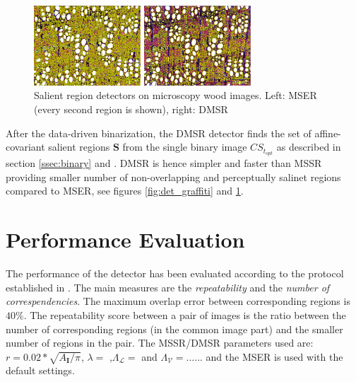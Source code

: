 \documentclass{article}
\def\I{{\mathbf I}}
\def\mcL{{\mathcal{L}}}
\def\mcV{{\mathcal{V}}}
\def\S{{\mathbf S}}
\begin{document}
\begin{figure}[htb]

\begin{minipage}[b]{.49\linewidth}
  \centering
  \centerline{\includegraphics[width=4.0cm]{./Figs/mserWood}}
\end{minipage}
\hfill
\begin{minipage}[b]{0.49\linewidth}
  \centering
  \centerline{\includegraphics[width=4.0cm]{./Figs/dmsrWood}}
\end{minipage}
\vspace{-0.25cm}
\caption{Salient region detectors on microscopy wood images. Left: MSER (every second region is shown), right: DMSR}
\label{fig:wood}
%
\end{figure}
After the data-driven binarization, the DMSR detector finds the set of affine-covariant salient regions $\S$ from the single binary image $CS_{t_{opt}}$ as described in section \ref{ssec:binary} and \cite{RangMSSR06, RangHumpb06}. DMSR is hence simpler and faster than MSSR providing smaller number of non-overlapping and perceptually salinet regions compared to MSER, see figures \ref{fig:det_graffiti} and \ref{fig:wood}.


\section{Performance  Evaluation}
\label{sec:perf}
The performance of the detector has been evaluated according to the protocol established in \cite{Mikolajczyk:2005}. The main measures are the {\em repeatability} and the {\em number of correspendencies}. The maximum overlap error between corresponding regions is $40\%$. The repeatability score between a pair of images is the ratio between the number of corresponding regions (in the common image part) and the smaller number of regions in the pair. The MSSR/DMSR parameters used are: $r = 0.02*\sqrt{A_{\I} / \pi}$, $\lambda=$ ,$\Lambda_{\mcL}=$ and $\Lambda_{\mcV}=$...... and the MSER is used with the default settings.
\end{document}
